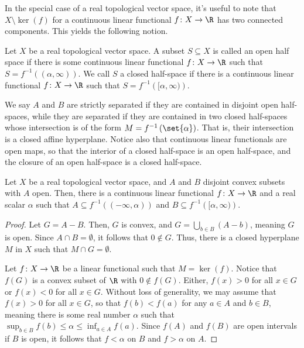 \documentclass[10pt]{mypackage}
\begin{document}
In the special case of a real topological vector space, it's useful to note that $X\setminus \ker\left( f \right)$ for a continuous linear functional $f\colon X\rightarrow \R$ has two connected components. This yields the following notion.
\begin{definition}
  Let $X$ be a real topological vector space. A subset $S\subseteq X$ is called an open half space if there is some continuous linear functional $f\colon X\rightarrow \R$ such that $S = f^{-1}\left( \left( \alpha,\infty \right) \right)$. We call $S$ a closed half-space if there is a continuous linear functional $f\colon X\rightarrow \R$ such that $S = f^{-1}\left( [\alpha,\infty) \right)$.
\end{definition}
We say $A$ and $B$ are strictly separated if they are contained in disjoint open half-spaces, while they are separated if they are contained in two closed half-spaces whose intersection is of the form $M = f^{-1}\left( \set{\alpha} \right)$. That is, their intersection is a closed affine hyperplane. Notice also that continuous linear functionals are open maps, so that the interior of a closed half-space is an open half-space, and the closure of an open half-space is a closed half-space.
\begin{theorem}
  Let $X$ be a real topological vector space, and $A$ and $B$ disjoint convex subsets with $A$ open. Then, there is a continuous linear functional $f\colon X\rightarrow \R$ and a real scalar $\alpha$ such that $A\subseteq f^{-1}\left( \left( -\infty,\alpha \right) \right)$ and $B\subseteq f^{-1}\left( [\alpha,\infty) \right)$.
\end{theorem}
\begin{proof}
  Let $G = A - B$. Then, $G$ is convex, and $G = \bigcup_{b\in B}\left( A-b \right)$, meaning $G$ is open. Since $A\cap B = \emptyset$, it follows that $0\notin G$. Thus, there is a closed hyperplane $M$ in $X$ such that $M\cap G = \emptyset$.

  Let $f\colon X\rightarrow \R$ be a linear functional such that $M = \ker\left( f \right)$. Notice that $f(G)$ is a convex subset of $\R$ with $0\notin f(G)$. Either, $f(x) > 0$ for all $x\in G $ or $f(x) < 0$ for all $x\in G$. Without loss of generality, we may assume that $f(x) > 0$ for all $x\in G$, so that $f(b) < f(a)$ for any $a\in A$ and $b\in B$, meaning there is some real number $\alpha$ such that $\sup_{b\in B}f(b)\leq \alpha \leq \inf_{a\in A}f(a)$. Since $f(A)$ and $f(B)$ are open intervals if $B$ is open, it follows that $f < \alpha$ on $B$ and $f > \alpha$ on $A$.
\end{proof}
\end{document}
